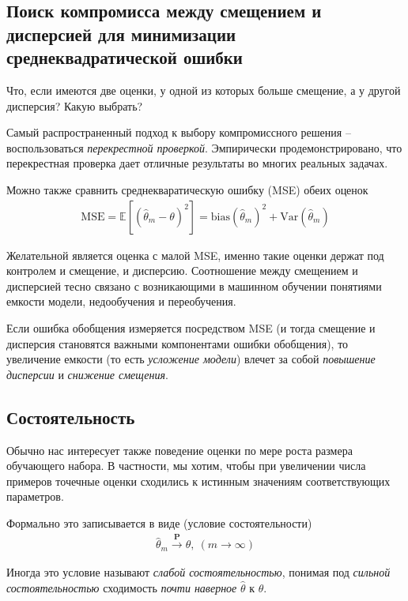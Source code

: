\documentclass[%
	11pt,
	a4paper,
	utf8,
]{article}
\begin{document}
\subsection{Поиск компромисса между смещением и дисперсией для минимизации среднеквадратической ошибки}

Что, если имеются две оценки, у одной из которых больше смещение, а у другой дисперсия? Какую выбрать? 

Самый распространенный подход к выбору компромиссного решения -- воспользоваться \emph{перекрестной проверкой}. Эмпирически продемонстрировано, что перекрестная проверка дает отличные результаты во многих реальных задачах.

Можно также сравнить среднекваратическую ошибку (MSE) обеих оценок
\begin{align*}
	\text{MSE} = \mathbb{E} [ ( \hat{\theta}_m - \theta )^2] = \text{bias}(\hat{\theta}_m)^2 + \text{Var}(\hat{\theta}_m)
\end{align*}

Желательной является оценка с малой MSE, именно такие оценки держат под контролем и смещение, и дисперсию. Соотношение между смещением и дисперсией тесно связано с возникающими в машинном обучении понятиями емкости модели, недообучения и переобучения.

Если ошибка обобщения измеряется посредством MSE (и тогда смещение и дисперсия становятся важными компонентами ошибки обобщения), то увеличение емкости (то есть \emph{усложение модели}) влечет за собой \emph{повышение дисперсии} и \emph{снижение смещения}.


\subsection{Состоятельность}

Обычно нас интересует также поведение оценки по мере роста размера обучающего набора. В частности, мы хотим, чтобы при увеличении числа примеров точечные оценки сходились к истинным значениям соответствующих параметров.

Формально это записывается в виде (условие состоятельности)
\begin{align*}
	\hat{\theta}_m \stackrel{\mathbf{P}}{\longrightarrow} \theta, \ (m \to \infty)
\end{align*}

Иногда это условие называют \emph{слабой состоятельностью}, понимая под \emph{сильной состоятельностью} сходимость \emph{почти наверное} $ \hat{\theta} $ к $ \theta $.
\end{document}
